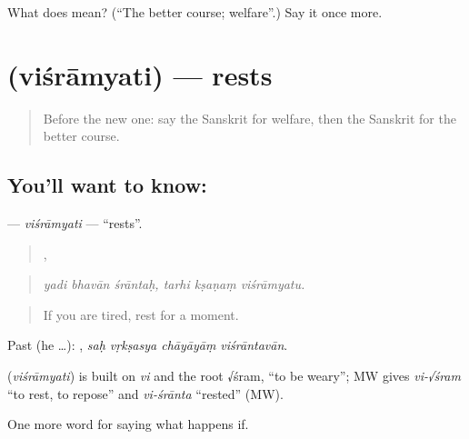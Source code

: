 \begin{tcolorbox}[breakable,colback=teal!4,colframe=teal!35!black,title={Before you move on}]
What does  mean? (\textquotedblleft{}The better course; welfare\textquotedblright{}.) Say it once more.
\end{tcolorbox}
\section[\texorpdfstring{\sk{विश्राम्यति} (viśrāmyati)}{विश्राम्यति (viśrāmyati)}]{ (viśrāmyati) — rests}

\label{lesson:SA-C382-visramyati}



\begin{quote}
Before the new one: say the Sanskrit for welfare, then the Sanskrit for the better course.
\end{quote}

\subsection*{You'll want to know: }
\textbf{} — \emph{viśrāmyati} — \textquotedblleft{}rests\textquotedblright{}.

\begin{quote}
  ,   
\end{quote}

\begin{quote}
\emph{yadi bhavān śrāntaḥ, tarhi kṣaṇaṃ viśrāmyatu.}
\end{quote}

\begin{quote}
If you are tired, rest for a moment.
\end{quote}

Past (he …):    , \emph{saḥ vṛkṣasya chāyāyāṃ viśrāntavān}.

\begin{cousinweb}
\textbf{} (\emph{viśrāmyati}) is built on \emph{vi} and the root √śram, \textquotedblleft{}to be weary\textquotedblright{}; MW gives \emph{vi-√śram} \textquotedblleft{}to rest, to repose\textquotedblright{} and \emph{vi-śrānta} \textquotedblleft{}rested\textquotedblright{} (MW).
\end{cousinweb}

\begin{grammarlens}[title={What you've built}]
One more word for saying what happens if.
\end{grammarlens}


